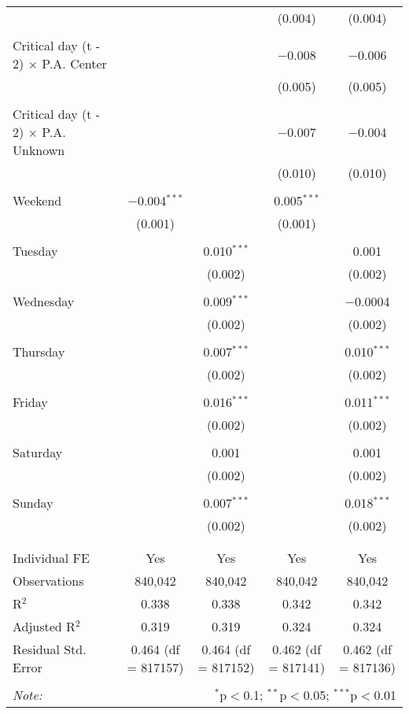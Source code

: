 \documentclass[
]{article}
\begin{document}
\begin{table}[!htbp]
{\begin{tabular}{@{\extracolsep{5pt}}lcccc}
  &  &  & (0.004) & (0.004) \\ 
  & & & & \\ 
 Critical day (t - 2) $\times$ P.A. Center &  &  & $-$0.008 & $-$0.006 \\ 
  &  &  & (0.005) & (0.005) \\ 
  & & & & \\ 
 Critical day (t - 2) $\times$ P.A. Unknown &  &  & $-$0.007 & $-$0.004 \\ 
  &  &  & (0.010) & (0.010) \\ 
  & & & & \\ 
 Weekend & $-$0.004$^{***}$ &  & 0.005$^{***}$ &  \\ 
  & (0.001) &  & (0.001) &  \\ 
  & & & & \\ 
 Tuesday &  & 0.010$^{***}$ &  & 0.001 \\ 
  &  & (0.002) &  & (0.002) \\ 
  & & & & \\ 
 Wednesday &  & 0.009$^{***}$ &  & $-$0.0004 \\ 
  &  & (0.002) &  & (0.002) \\ 
  & & & & \\ 
 Thursday &  & 0.007$^{***}$ &  & 0.010$^{***}$ \\ 
  &  & (0.002) &  & (0.002) \\ 
  & & & & \\ 
 Friday &  & 0.016$^{***}$ &  & 0.011$^{***}$ \\ 
  &  & (0.002) &  & (0.002) \\ 
  & & & & \\ 
 Saturday &  & 0.001 &  & 0.001 \\ 
  &  & (0.002) &  & (0.002) \\ 
  & & & & \\ 
 Sunday &  & 0.007$^{***}$ &  & 0.018$^{***}$ \\ 
  &  & (0.002) &  & (0.002) \\ 
  & & & & \\ 
\hline \\[-1.8ex] 
Individual FE & Yes & Yes & Yes & Yes \\ 
Observations & 840,042 & 840,042 & 840,042 & 840,042 \\ 
R$^{2}$ & 0.338 & 0.338 & 0.342 & 0.342 \\ 
Adjusted R$^{2}$ & 0.319 & 0.319 & 0.324 & 0.324 \\ 
Residual Std. Error & 0.464 (df = 817157) & 0.464 (df = 817152) & 0.462 (df = 817141) & 0.462 (df = 817136) \\ 
\hline 
\hline \\[-1.8ex] 
\textit{Note:}  & \multicolumn{4}{r}{$^{*}$p$<$0.1; $^{**}$p$<$0.05; $^{***}$p$<$0.01} \\ 
\end{tabular}
} 
\end{table} 
\newpage
\end{document}
